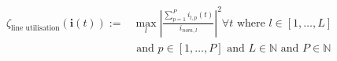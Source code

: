 \begin{equation}
\begin{split}
	\zeta_\text{line utilisation}(\textbf{i}(t)) :=& %
	\max_{l}{\left|\frac{\sum_{p=1}^{P}{i_{l,p}(t)}}{i_{nom,l}}\right|^2} \forall t \text{ where } l \in [1, \dots, L] \\
	&\text{ and } p \in [1, \dots, P] \text{ and } L \in \mathbb{N} \text{ and } P \in \mathbb{N}
\end{split}
\label{ch1:equ:line-utilisation}
\end{equation}